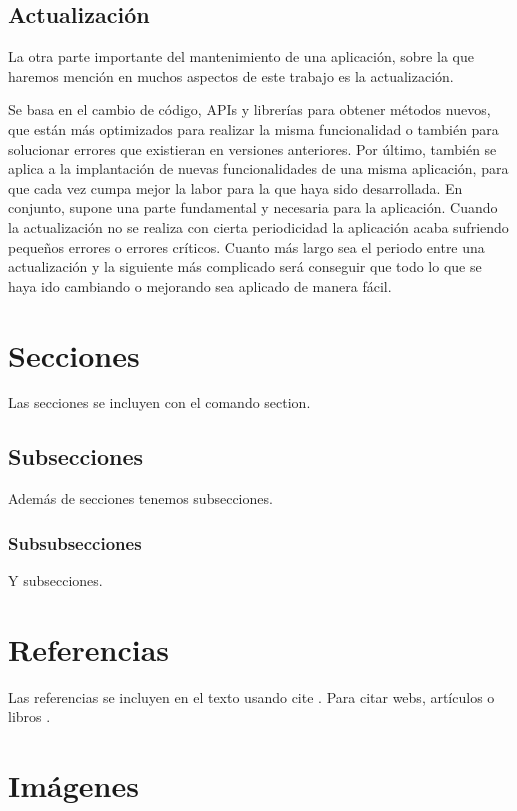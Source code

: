 \subsection{Actualización}

La otra parte importante del mantenimiento de una aplicación, sobre la que haremos mención en muchos aspectos de este trabajo es la actualización. 

Se basa en el cambio de código, APIs y librerías para obtener métodos nuevos, que están más optimizados para realizar la misma funcionalidad o también para solucionar errores que existieran en versiones anteriores. Por último, también se aplica a la implantación de nuevas funcionalidades de una misma aplicación, para que cada vez cumpa mejor la labor para la que haya sido desarrollada. En conjunto, supone una parte fundamental y necesaria para la aplicación. Cuando la actualización no se realiza con cierta periodicidad la aplicación acaba sufriendo pequeños errores o errores críticos. Cuanto más largo sea el periodo entre una actualización y la siguiente más complicado será conseguir que todo lo que se haya ido cambiando o mejorando sea aplicado de manera fácil.

\section{Secciones}

Las secciones se incluyen con el comando section.

\subsection{Subsecciones}

Además de secciones tenemos subsecciones.

\subsubsection{Subsubsecciones}

Y subsecciones. 


\section{Referencias}

Las referencias se incluyen en el texto usando cite \cite{wiki:latex}. Para citar webs, artículos o libros \cite{koza92}.


\section{Imágenes}


